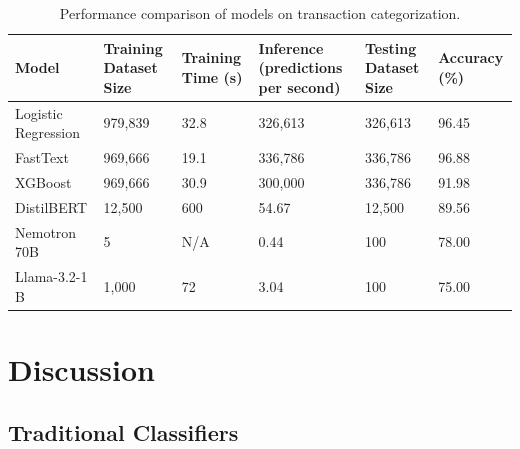 \documentclass[12pt,letterpaper]{article}
\begin{document}
\vspace{0.5cm} 

\begin{table}[H]
    \centering
    \begin{tabular}{|l|p{2.5cm}|p{1.7cm}|p{3.5cm}|p{2.5cm}|p{1.7cm}|}
    \hline
    \textbf{Model}           & \textbf{Training Dataset Size} & \textbf{Training Time (s)} & \textbf{Inference (predictions per second)} & \textbf{Testing Dataset Size} & \textbf{Accuracy (\%)} \\ \hline
    Logistic Regression      & 979,839                        & 32.8                       & 326,613                                     & 326,613                      & 96.45                 \\ \hline
    FastText                 & 969,666                        & 19.1              & 336,786                            & 336,786                     & 96.88        \\ \hline
    XGBoost                  & 969,666                        & 30.9                       & 300,000                                     & 336,786                      & 91.98                 \\ \hline
    DistilBERT               & 12,500                         & 600                        & 54.67                                       & 12,500                       & 89.56                 \\ \hline
    Nemotron 70B             & 5                              & N/A                        & 0.44                                        & 100                          & 78.00                 \\ \hline
    Llama-3.2-1 B            & 1,000                          & 72                         & 3.04                                        & 100                          & 75.00                 \\ \hline
    \end{tabular}
    \caption{Performance comparison of models on transaction categorization.}
    \label{tab:model_comparison}
\end{table}


\section{Discussion}
\subsection{Traditional Classifiers}
\end{document}
